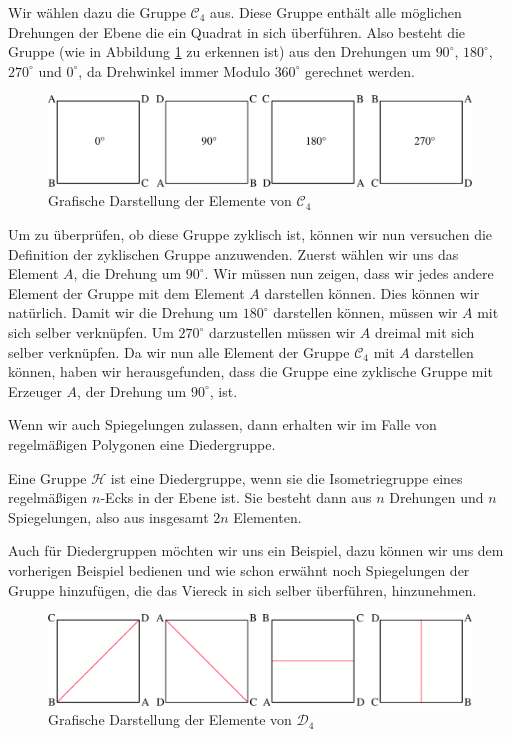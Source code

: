 Wir wählen dazu die Gruppe $\mathcal{C}_4$ aus. Diese Gruppe enthält alle möglichen Drehungen der Ebene die ein Quadrat in sich überführen. Also besteht die Gruppe (wie in Abbildung \ref{fig:zyklische_gruppe_c4} zu erkennen ist) aus den Drehungen um $90^{\circ}$, $180^{\circ}$, $270^{\circ}$ und $0^{\circ}$, da Drehwinkel immer Modulo $360^{\circ}$ gerechnet werden.
\begin{figure}[H]
	\centering
	\includegraphics[width=1\linewidth]{grafiken/zyklische_gruppe_c4}
	\caption{Grafische Darstellung der Elemente von $\mathcal{C}_4$}
	\label{fig:zyklische_gruppe_c4}
\end{figure}
Um zu überprüfen, ob diese Gruppe zyklisch ist, können wir nun versuchen die Definition der zyklischen Gruppe anzuwenden. Zuerst wählen wir uns das Element $A$, die Drehung um $90^{\circ}$. Wir müssen nun zeigen, dass wir jedes andere Element der Gruppe mit dem Element $A$ darstellen können. Dies können wir natürlich. Damit wir die Drehung um $180^{\circ}$ darstellen können, müssen wir $A$ mit sich selber verknüpfen. Um $270^{\circ}$ darzustellen müssen wir $A$ dreimal mit sich selber verknüpfen. Da wir nun alle Element der Gruppe $\mathcal{C}_4$ mit $A$ darstellen können, haben wir herausgefunden, dass die Gruppe eine zyklische Gruppe mit Erzeuger $A$, der Drehung um $90^{\circ}$, ist. \par\smallskip
Wenn wir auch Spiegelungen zulassen, dann erhalten wir im Falle von regelmäßigen Polygonen eine Diedergruppe.
\begin{defi}[Diedergruppe]
	Eine Gruppe $\mathcal{H}$ ist eine Diedergruppe, wenn sie die Isometriegruppe eines regelmäßigen $n$-Ecks in der Ebene ist. Sie besteht dann aus $n$ Drehungen und $n$ Spiegelungen, also aus insgesamt $2n$ Elementen.
\end{defi}
Auch für Diedergruppen möchten wir uns ein Beispiel, dazu können wir uns dem vorherigen Beispiel bedienen und wie schon erwähnt noch Spiegelungen der Gruppe hinzufügen, die das Viereck in sich selber überführen, hinzunehmen.
\begin{figure}[H]
	\centering
	\includegraphics[width=1\linewidth]{grafiken/dieder_gruppe}
	\caption{Grafische Darstellung der Elemente von $\mathcal{D}_4$}
	\label{fig:zyklische_gruppe_d4}
\end{figure}
